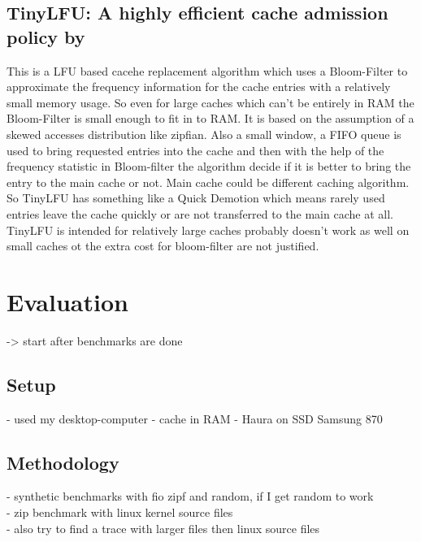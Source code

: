 \documentclass[
	12pt,
	a4paper,
	abstract,
	bibliography=totoc,
	chapterprefix,
	headings=openright,
	numbers=endperiod,
	parskip=half,
	twoside,
]{scrreprt}
\begin{document}
\section*{TinyLFU: A highly efficient cache admission policy by \cite{einziger2017tinylfu}}

This is a LFU based cacehe replacement algorithm which uses a Bloom-Filter to approximate the frequency information for the cache entries with a relatively small memory usage.
So even for large caches which can't be entirely in RAM the Bloom-Filter is small enough to fit in to RAM.
It is based on the assumption of a skewed accesses distribution like zipfian.
Also a small window, a FIFO queue is used to bring requested entries into the cache and then
with the help of the frequency statistic in Bloom-filter the algorithm decide if it is better to bring the entry to the main cache or not. Main cache could be different caching algorithm.
So TinyLFU has something like a Quick Demotion which means rarely used entries leave the cache quickly or are not transferred to the main cache at all.
TinyLFU is intended for relatively large caches probably doesn't work as well on small caches ot the extra cost for bloom-filter are not justified.


\chapter{Evaluation}
\label{cha:evaluation}



-> start after benchmarks are done

\section{Setup}

- used my desktop-computer
- cache in RAM 
- Haura on SSD Samsung 870


\section{Methodology}
- synthetic benchmarks with fio zipf and random, if I get random to work\\
- zip benchmark with linux kernel source files\\
- also try to find a trace with larger files then linux source files\\
\end{document}
